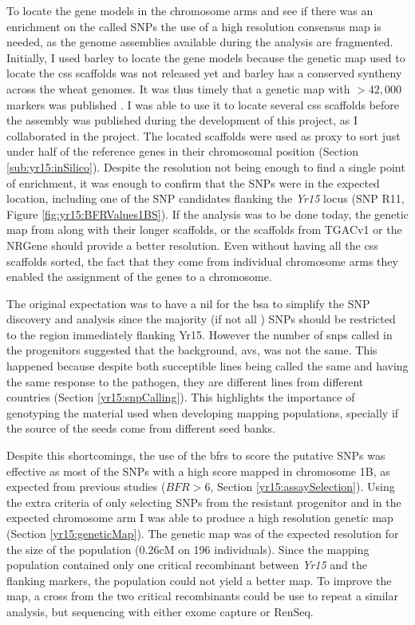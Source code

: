 To locate the gene models in the chromosome arms and see if there was an enrichment on the called SNPs the use of a high resolution consensus map is needed, as the genome assemblies available during the analysis are fragmented. 
Initially, I used barley to locate the gene models because the genetic map used to locate the \gls{css} scaffolds was not released yet and barley has a conserved syntheny across the wheat genomes. 
It was thus timely that a genetic map with $>42,000$ markers was published \citep{Wang2014}. 
I was able to use it to locate several \acrshort{css} scaffolds before the assembly was published during the development of this project, as I collaborated in the project. 
The located scaffolds were used as proxy to sort just under half of the reference genes in their chromosomal position (Section \ref{sub:yr15:inSilico}). 
Despite the resolution not being enough to find a single point of enrichment, it was enough to confirm that the SNPs were in the expected location, including one of the SNP candidates flanking the \textit{Yr15} locus (SNP R11, Figure \ref{fig:yr15:BFRValues1BS}).  
If the analysis was to be done today, the genetic map from \citet{Chapman2015} along with their longer scaffolds, or the scaffolds from TGACv1 or the NRGene should provide a better resolution. 
Even without having all the \acrshort{css} scaffolds sorted, the fact that they come from individual chromosome arms they enabled the assignment of the genes to a chromosome. 

The original expectation was to have a \gls{nil} for the \gls{bsa} to simplify the SNP discovery and analysis since the majority (if not all ) SNPs should be restricted to the region immediately flanking Yr15. However the number of \glspl{snp} called in the progenitors suggested that the background, \acrlong{avs}, was not the same.  
This happened because despite both succeptible lines being called the same and having the same response to the pathogen, they are different lines from different countries (Section \ref{yr15:snpCalling}). 
This highlights the importance of genotyping the material used when developing mapping populations, specially if the source of the seeds come from different seed banks. 

Despite this shortcomings, the use of the \glspl{bfr} to score the putative SNPs was effective as most of the SNPs with a high score  mapped in chromosome 1B, as expected from previous studies ($BFR>6$, Section \ref{yr15:assaySelection}).
Using the extra criteria of only selecting SNPs from the resistant progenitor and in the expected chromosome arm I was able to produce a high resolution genetic map (Section \ref{yr15:geneticMap}). 
The genetic map was of the expected resolution for the size of the population (0.26cM on 196 individuals).
Since the mapping population contained only one critical recombinant between \textit{Yr15} and the flanking markers, the population could not yield a better map. 
To improve the map, a cross from the two critical recombinants could be use to repeat a similar analysis, but sequencing with either exome capture or RenSeq. 

